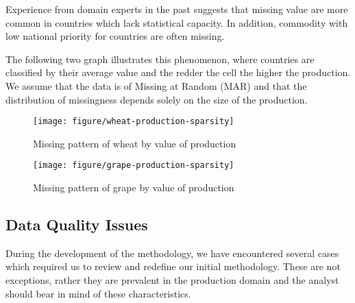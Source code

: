 \documentclass[nojss]{jss}\usepackage[]{graphicx}\usepackage[]{color}
\makeatletter
\def\maxwidth{ %
  \ifdim\Gin@nat@width>\linewidth
    \linewidth
  \else
    \Gin@nat@width
  \fi
}
\newenvironment{knitrout}{}{} %
\makeatother
\begin{document}
Experience from domain experts in the past suggests that missing value
are more common in countries which lack statistical capacity. In
addition, commodity with low national priority for countries are often
missing.

The following two graph illustrates this phenomenon, where countries
are classified by their average value and the redder the cell the
higher the production. We assume that the data is of Missing at Random
(MAR) and that the distribution of missingness depends solely on the
size of the production.

\begin{knitrout}
\color{fgcolor}\begin{figure}[!ht]


{\centering \texttt{[image: figure/wheat-production-sparsity]} 

}

\caption[Missing pattern of wheat by value of production]{Missing pattern of wheat by value of production\label{fig:wheat-production-sparsity}}
\end{figure}


\end{knitrout}



\begin{knitrout}
\color{fgcolor}\begin{figure}[!ht]


{\centering \texttt{[image: figure/grape-production-sparsity]} 

}

\caption[Missing pattern of grape by value of production]{Missing pattern of grape by value of production\label{fig:grape-production-sparsity}}
\end{figure}


\end{knitrout}


\FloatBarrier
\subsection{Data Quality Issues}
During the development of the methodology, we have encountered several
cases which required us to review and redefine our initial
methodology. These are not exceptions, rather they are prevalent in
the production domain and the analyst should bear in mind of these
characteristics.
\end{document}
